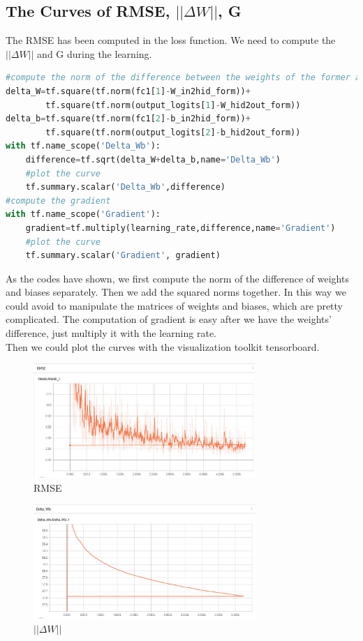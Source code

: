 \documentclass{article}
\begin{document}
\subsection{The Curves of RMSE, $||\Delta W||$, G}
The RMSE has been computed in the loss function. We need to compute the $||\Delta W||$ and G during the learning.
\begin{lstlisting}[language=Python]
#compute the norm of the difference between the weights of the former and the present batches
delta_W=tf.square(tf.norm(fc1[1]-W_in2hid_form))+
        tf.square(tf.norm(output_logits[1]-W_hid2out_form))
delta_b=tf.square(tf.norm(fc1[2]-b_in2hid_form))+
        tf.square(tf.norm(output_logits[2]-b_hid2out_form))
with tf.name_scope('Delta_Wb'):
    difference=tf.sqrt(delta_W+delta_b,name='Delta_Wb')
    #plot the curve
    tf.summary.scalar('Delta_Wb',difference)
#compute the gradient
with tf.name_scope('Gradient'):
    gradient=tf.multiply(learning_rate,difference,name='Gradient')
    #plot the curve
    tf.summary.scalar('Gradient', gradient)
\end{lstlisting}
As the codes have shown, we first compute the norm of the difference of weights and biases separately. Then we add the squared norms together. In this way we could avoid to manipulate the matrices of weights and biases, which are pretty complicated. The computation of gradient is easy after we have the weights' difference, just multiply it with the learning rate.\\
Then we could plot the curves with the visualization toolkit tensorboard.
  \begin{figure}[H]
  \centering
  \includegraphics[width=0.75\textwidth]{RMSE.jpg}
  \caption{RMSE}\label{}
  \end{figure}
  \begin{figure}[H]
  \centering
  \includegraphics[width=0.75\textwidth]{DeltaWb.jpg}
  \caption{$||\Delta W||$}\label{}
  \end{figure}
\end{document}
